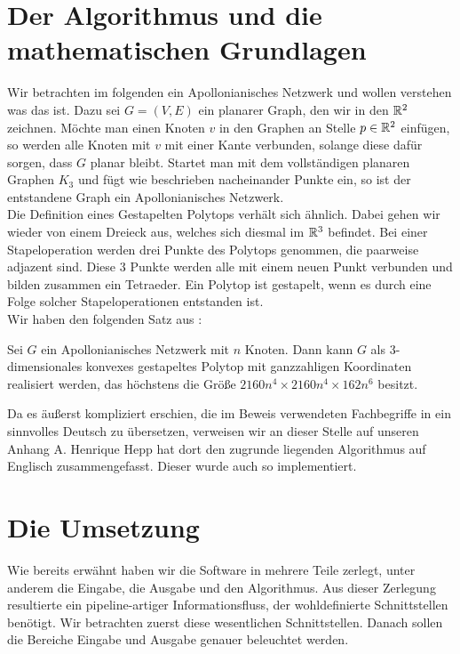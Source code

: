 \section*{Der Algorithmus und die mathematischen Grundlagen}
Wir betrachten im folgenden ein Apollonianisches Netzwerk und wollen verstehen was das ist. Dazu sei $G=(V,E)$ ein planarer Graph, den wir in den $\mathbb{R}^2$ zeichnen. Möchte man einen Knoten $v$ in den Graphen an Stelle $p\in\mathbb{R}^2$ einfügen, so werden alle Knoten mit $v$ mit einer Kante verbunden, solange diese dafür sorgen, dass $G$ planar bleibt. Startet man mit dem vollständigen planaren Graphen $K_3$ und fügt wie beschrieben nacheinander Punkte ein, so ist der entstandene Graph ein Apollonianisches Netzwerk.\\
Die Definition eines Gestapelten Polytops verhält sich ähnlich. Dabei gehen wir wieder von einem Dreieck aus, welches sich diesmal im $\mathbb{R}^3$ befindet. Bei einer Stapeloperation werden drei Punkte des Polytops genommen, die paarweise adjazent sind. Diese 3 Punkte werden alle mit einem neuen Punkt verbunden und bilden zusammen ein Tetraeder. Ein Polytop ist gestapelt, wenn es durch eine Folge solcher Stapeloperationen entstanden ist.\\
Wir haben den folgenden Satz aus \cite{stackedPoly1}:

\begin{thm}
Sei $G$ ein Apollonianisches Netzwerk mit $n$ Knoten. Dann kann $G$ als $3$-dimensionales konvexes gestapeltes Polytop mit ganzzahligen Koordinaten realisiert werden, das höchstens die Größe $2160n^4\times 2160n^4\times 162n^6$ besitzt.
\end{thm}

Da es äußerst kompliziert erschien, die im Beweis verwendeten Fachbegriffe in ein sinnvolles Deutsch zu übersetzen, verweisen wir an dieser Stelle auf unseren Anhang A. Henrique Hepp hat dort den zugrunde liegenden Algorithmus auf Englisch zusammengefasst. Dieser wurde auch so implementiert.

\section*{Die Umsetzung}
Wie bereits erwähnt haben wir die Software in mehrere Teile zerlegt, unter anderem die Eingabe, die Ausgabe und den Algorithmus. Aus dieser Zerlegung resultierte ein pipeline-artiger Informationsfluss, der wohldefinierte Schnittstellen benötigt. Wir betrachten zuerst diese wesentlichen Schnittstellen. Danach sollen die Bereiche Eingabe und Ausgabe genauer beleuchtet werden. 

